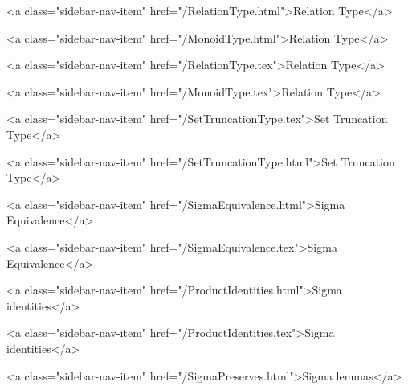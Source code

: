       
    
      
        
          <a class="sidebar-nav-item" href="/RelationType.html">Relation Type</a>
        
      
    
      
        
          <a class="sidebar-nav-item" href="/MonoidType.html">Relation Type</a>
        
      
    
      
        
          <a class="sidebar-nav-item" href="/RelationType.tex">Relation Type</a>
        
      
    
      
        
          <a class="sidebar-nav-item" href="/MonoidType.tex">Relation Type</a>
        
      
    
      
        
          <a class="sidebar-nav-item" href="/SetTruncationType.tex">Set Truncation Type</a>
        
      
    
      
        
          <a class="sidebar-nav-item" href="/SetTruncationType.html">Set Truncation Type</a>
        
      
    
      
        
          <a class="sidebar-nav-item" href="/SigmaEquivalence.html">Sigma Equivalence</a>
        
      
    
      
        
          <a class="sidebar-nav-item" href="/SigmaEquivalence.tex">Sigma Equivalence</a>
        
      
    
      
        
          <a class="sidebar-nav-item" href="/ProductIdentities.html">Sigma identities</a>
        
      
    
      
        
          <a class="sidebar-nav-item" href="/ProductIdentities.tex">Sigma identities</a>
        
      
    
      
        
          <a class="sidebar-nav-item" href="/SigmaPreserves.html">Sigma lemmas</a>
        
